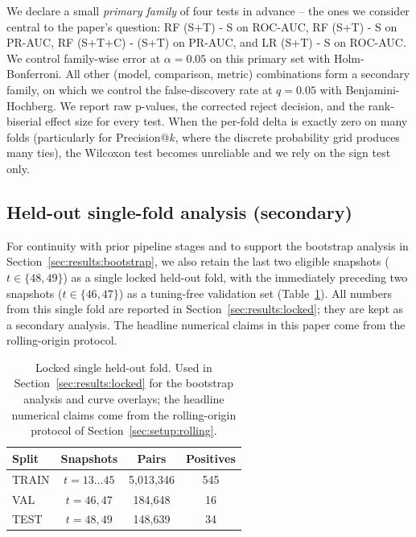 We declare a small \emph{primary family} of four tests in advance --
the ones we consider central to the paper's question: RF (S+T) - S on
ROC-AUC, RF (S+T) - S on PR-AUC, RF (S+T+C) - (S+T) on PR-AUC, and
LR (S+T) - S on ROC-AUC. We control family-wise error at
$\alpha = 0.05$ on this primary set with Holm-Bonferroni. All other
(model, comparison, metric) combinations form a secondary family, on
which we control the false-discovery rate at $q = 0.05$ with
Benjamini-Hochberg. We report raw p-values, the corrected reject
decision, and the rank-biserial effect size for every test. When the
per-fold delta is exactly zero on many folds (particularly for
Precision@$k$, where the discrete probability grid produces many
ties), the Wilcoxon test becomes unreliable and we rely on the sign
test only.

\subsection{Held-out single-fold analysis (secondary)}
\label{sec:setup:locked}

For continuity with prior pipeline stages and to support the bootstrap
analysis in Section~\ref{sec:results:bootstrap}, we also retain the
last two eligible snapshots ($t \in \{48, 49\}$) as a single locked
held-out fold, with the immediately preceding two snapshots
($t \in \{46, 47\}$) as a tuning-free validation set
(Table~\ref{tab:split}). All numbers from this single fold are
reported in Section~\ref{sec:results:locked}; they are kept as a
secondary analysis. The headline numerical claims in this paper come
from the rolling-origin protocol.

\begin{table}[t]
\caption{Locked single held-out fold. Used in
Section~\ref{sec:results:locked} for the bootstrap analysis and curve
overlays; the headline numerical claims come from the rolling-origin
protocol of Section~\ref{sec:setup:rolling}.}
\label{tab:split}
\centering
\begin{tabular}{lccc}
\toprule
Split & Snapshots & Pairs & Positives \\
\midrule
TRAIN & $t = 13 \dots 45$ & 5{,}013{,}346 & 545 \\
VAL   & $t = 46, 47$      &   184{,}648   &  16 \\
TEST  & $t = 48, 49$      &   148{,}639   &  34 \\
\bottomrule
\end{tabular}
\end{table}

